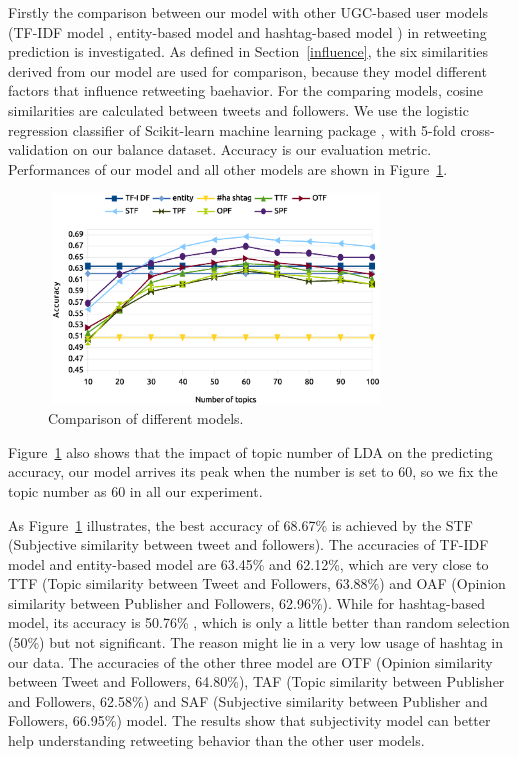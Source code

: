 \documentclass[twocolumn]{svjour3}          %
\begin{document}
Firstly the comparison between our model with other UGC-based user models (TF-IDF model \cite{Luo:2013RMF}, entity-based model and hashtag-based model \cite{Abel:2011AUM}) in retweeting prediction is investigated. 
As defined in Section~\ref{influence}, the six similarities derived from our model are used for comparison, because they model different factors that influence retweeting baehavior. 
For the comparing models, cosine similarities are calculated between tweets and followers.
We use the logistic regression classifier of Scikit-learn machine learning package \cite{scikit-learn}, with 5-fold cross-validation on our balance dataset. Accuracy is our evaluation metric.
Performances of our model and all other models are shown in Figure~\ref{fig4}.
\begin{figure}[htb]
\centering
\includegraphics[width=3.5in,height=2.2in]{fig4.eps}
\caption{Comparison of different models.}
\label{fig4}
\end{figure}
Figure~\ref{fig4} also shows that the impact of topic number of LDA on the predicting accuracy, our model arrives its peak when the number is set to 60, so we fix the topic number as 60 in all our experiment. 

As Figure~\ref{fig4} illustrates, the best accuracy of 68.67\% is achieved by the STF (Subjective similarity between tweet and followers). 
The accuracies of TF-IDF model and entity-based model are 63.45\% and 62.12\%, which are very close to TTF (Topic similarity between Tweet and Followers, 63.88\%) and OAF (Opinion similarity between Publisher and Followers, 62.96\%). 
While for hashtag-based model, its accuracy is 50.76\% , which is only a little better than random selection (50\%) but not significant. The reason might lie in a very low usage of hashtag in our data. 
The accuracies of the other three model are OTF (Opinion similarity between Tweet and Followers, 64.80\%), TAF (Topic similarity between Publisher and Followers, 62.58\%) and SAF (Subjective similarity between Publisher and Followers, 66.95\%) model. 
The results show that subjectivity model can better help understanding retweeting behavior than the other user models.
\end{document}
